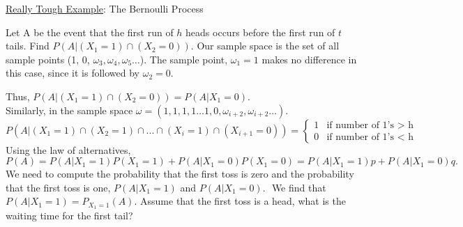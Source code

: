 {\underline {Really Tough Example}: The Bernoulli Process}

Let A be the event that the first run of $h$ heads occurs before the first run of $t$ tails.  Find $P(A|(X_1=1) \cap (X_2 = 0))$.  Our sample space is the set of all sample points (1, 0, $\omega_3, \omega_4, \omega_5 \ldots$).  The sample point, $\omega_1 = 1$ makes no difference in this case, since it is followed by $\omega_2 = 0$.

Thus, $P(A|(X_1=1) \cap (X_2 = 0)) = P(A|X_1 = 0)$. \\
Similarly, in the sample space $\omega = (1, 1, 1, 1 \dots 1, 0, \omega_{i+2},
\omega_{i+2} \ldots)$.
\begin{displaymath}
{P(A|(X_1=1) \cap (X_2=1) \cap ... \cap (X_i = 1) \cap (X_{i+1} =
0))}= \left\{ \begin{array} {ll} 1 &\mbox{if number of 1's $>$  h}\\ 0
& \mbox{if number of 1's $<$ h} \end{array} \right. 
\end{displaymath}
Using the law of alternatives, $$P(A)=P(A|X_1=1)P(X_1=1) + P(A|X_1=0)P(X_1=0)=P(A|X_1=1)p + P(A|X_1 = 0)q.$$  We need to compute the probability that the first toss is zero and the probability that the first toss is one,  $P(A|X_1=1)$ and $P(A|X_1=0).$ $ $  We find that $P(A|X_1 =1)= P_{X_1=1}(A).$  Assume that the first toss is a head, what is the waiting time for the first tail?  


